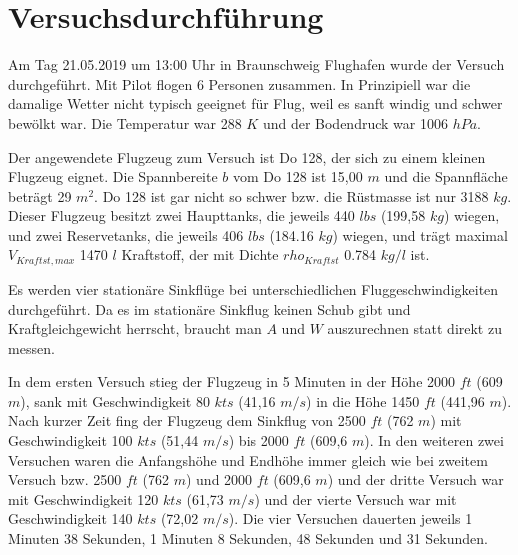 \chapter{Versuchsdurchführung}
\label{chapter:versuch}

\newpage

Am Tag 21.05.2019 um 13:00 Uhr in Braunschweig Flughafen wurde der Versuch durchgeführt. Mit Pilot flogen 6 Personen zusammen. In Prinzipiell war die damalige Wetter nicht typisch geeignet für Flug, weil es  sanft windig und schwer bewölkt war. Die Temperatur war 288 $K$ und der Bodendruck war 1006 $hPa$. 

Der angewendete Flugzeug zum Versuch ist Do 128, der sich zu einem kleinen Flugzeug eignet. Die Spannbereite $b$ vom Do 128 ist 15,00 $m$ und die Spannfläche beträgt 29 ${m}^{2}$. Do 128 ist gar nicht so schwer bzw. die Rüstmasse ist nur 3188 $kg$. Dieser Flugzeug besitzt zwei Haupttanks, die jeweils 440 $lbs$ (199,58 $kg$) wiegen, und zwei Reservetanks, die jeweils 406 $lbs$ (184.16 $kg$) wiegen, und trägt maximal $V_{Kraftst,max}$ 1470 $l$ Kraftstoff, der mit Dichte $rho_{Kraftst}$ 0.784 $kg/l$ ist. 

Es werden vier stationäre Sinkflüge bei unterschiedlichen Fluggeschwindigkeiten durchgeführt. Da  es im stationäre Sinkflug keinen Schub gibt und Kraftgleichgewicht herrscht, braucht man $A$ und $W$ auszurechnen statt direkt zu messen.

In dem ersten Versuch stieg der Flugzeug in 5 Minuten in der Höhe 2000 $ft$ (609 $m$), sank mit Geschwindigkeit 80 $kts$ (41,16 $m/s$) in die Höhe 1450 $ft$ (441,96 $m$). Nach kurzer Zeit fing der Flugzeug dem Sinkflug von 2500 $ft$ (762 $m$) mit Geschwindigkeit 100 $kts$ (51,44 $m/s$) bis 2000 $ft$ (609,6 $m$). In den weiteren zwei Versuchen waren die Anfangshöhe und Endhöhe immer gleich wie bei zweitem Versuch bzw. 2500 $ft$ (762 $m$) und 2000 $ft$ (609,6 $m$) und der dritte Versuch war mit Geschwindigkeit 120 $kts$ (61,73 $m/s$) und der vierte Versuch war mit Geschwindigkeit 140 $kts$ (72,02 $m/s$). Die vier Versuchen dauerten jeweils 1 Minuten 38 Sekunden, 1 Minuten 8 Sekunden, 48 Sekunden und 31 Sekunden.

